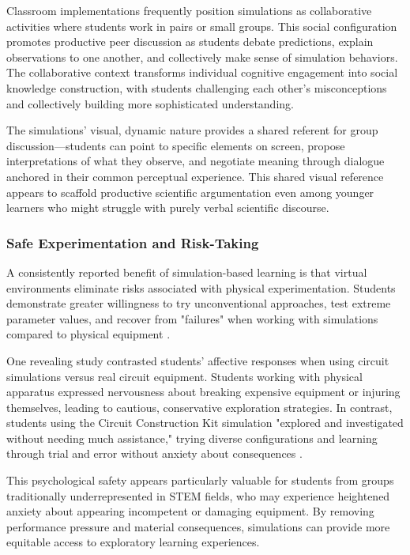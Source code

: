 Classroom implementations frequently position simulations as collaborative activities where students work in pairs or small groups. This social configuration promotes productive peer discussion as students debate predictions, explain observations to one another, and collectively make sense of simulation behaviors. The collaborative context transforms individual cognitive engagement into social knowledge construction, with students challenging each other's misconceptions and collectively building more sophisticated understanding.

The simulations' visual, dynamic nature provides a shared referent for group discussion—students can point to specific elements on screen, propose interpretations of what they observe, and negotiate meaning through dialogue anchored in their common perceptual experience. This shared visual reference appears to scaffold productive scientific argumentation even among younger learners who might struggle with purely verbal scientific discourse.

\subsubsection{Safe Experimentation and Risk-Taking}

A consistently reported benefit of simulation-based learning is that virtual environments eliminate risks associated with physical experimentation. Students demonstrate greater willingness to try unconventional approaches, test extreme parameter values, and recover from "failures" when working with simulations compared to physical equipment \cite{phet2023}.

One revealing study contrasted students' affective responses when using circuit simulations versus real circuit equipment. Students working with physical apparatus expressed nervousness about breaking expensive equipment or injuring themselves, leading to cautious, conservative exploration strategies. In contrast, students using the Circuit Construction Kit simulation "explored and investigated without needing much assistance," trying diverse configurations and learning through trial and error without anxiety about consequences \cite{finkelstein2005phet}.

This psychological safety appears particularly valuable for students from groups traditionally underrepresented in STEM fields, who may experience heightened anxiety about appearing incompetent or damaging equipment. By removing performance pressure and material consequences, simulations can provide more equitable access to exploratory learning experiences.

